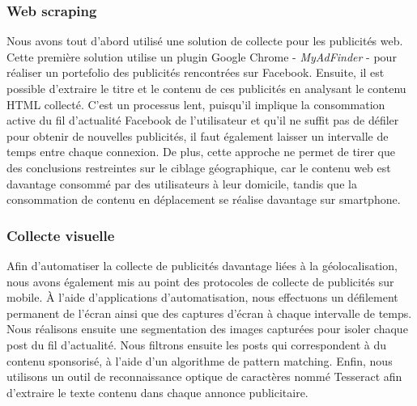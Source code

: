 \documentclass[runningheads]{llncs}
\begin{document}
\subsubsection{Web scraping}\label{collecte_web}

Nous avons tout d'abord utilisé une solution de collecte pour les publicités web. Cette première solution utilise un plugin Google Chrome - \textit{MyAdFinder} - pour réaliser un portefolio des publicités rencontrées sur Facebook. Ensuite, il est possible d'extraire le titre et le contenu de ces publicités en analysant le contenu HTML collecté. C'est un processus lent, puisqu'il implique la consommation active du fil d'actualité Facebook de l'utilisateur et qu'il ne suffit pas de défiler pour obtenir de nouvelles publicités, il faut également laisser un intervalle de temps entre chaque connexion.
De plus, cette approche ne permet de tirer que des conclusions restreintes sur le ciblage géographique, car le contenu web est davantage consommé par des utilisateurs à leur domicile, tandis que la consommation de contenu en déplacement se réalise davantage sur smartphone.

\subsubsection{Collecte visuelle}\label{collecte_mobile}

Afin d'automatiser la collecte de publicités davantage liées à la géolocalisation, nous avons également mis au point des protocoles de collecte de publicités sur mobile. À l'aide d'applications d'automatisation, nous effectuons un défilement permanent de l'écran ainsi que des captures d'écran à chaque intervalle de temps. Nous réalisons ensuite une segmentation des images capturées pour isoler chaque post du fil d'actualité. Nous filtrons ensuite les posts qui correspondent à du contenu sponsorisé, à l'aide d'un algorithme de pattern matching. Enfin, nous utilisons un outil de reconnaissance optique de caractères nommé Tesseract afin d'extraire le texte contenu dans chaque annonce publicitaire.
\end{document}
